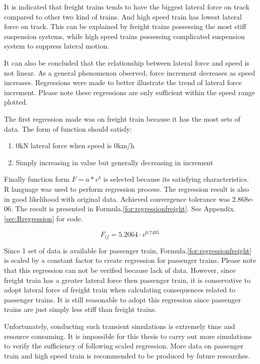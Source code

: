 It is indicated that freight trains tends to have the biggest lateral force on track compared to other two kind of trains. And high speed train has lowest lateral force on track. This can be explained by freight trains possessing the most stiff suspension systems, while high speed trains possessing complicated suspension system to suppress lateral motion.

It can also be concluded that the relationship between lateral force and speed is not linear. As a general phenomenon observed, force increment decreases as speed increases. Regressions were made to better illustrate the trend of lateral force increment. Please note these regressions are only sufficient within the speed range plotted.

The first regression made was on freight train because it has the most sets of data. The form of function should satisfy:

\begin{enumerate}  
    \item 0kN lateral force when speed is 0km/h
    \item Simply increasing in value but generally decreasing in increment
\end{enumerate}

Finally function form $F=a*v^b$ is selected because its satisfying characteristics. R language was used to perform regression process. The regression result is also in good likelihood with original data. Achieved convergence tolerance was 2.868e-06. The result is presented in Formula.\ref{for:regressionfreight}. See Appendix.\ref{sec:Rregression} for code.

\begin{equation}
\label{for:regressionfreight}
F_{lf} = 5.2064\cdot v^{0.7495}
\end{equation}

Since 1 set of data is available for passenger train, Formula.\ref{for:regressionfreight} is scaled by a constant factor to create regression for passenger trains. Please note that this regression can not be verified because lack of data. However, since freight train has a greater lateral force then passenger train, it is conservative to adopt lateral force of freight train when calculating consequences related to passenger trains. It is still reasonable to adopt this regression since passenger trains are just simply less stiff than freight trains. 

Unfortunately, conducting such transient simulations is extremely time and resource consuming. It is impossible for this thesis to carry out more simulations to verify the sufficiency of following scaled regression. More data on passenger train and high speed train is recommended to be produced by future researches.

